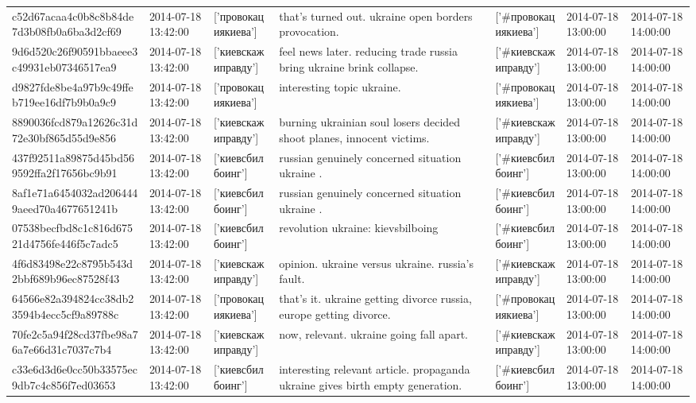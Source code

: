 \begin{tabular}{lllllll}
c52d67acaa4c0b8c8b84de7d3b08fb0a6ba3d2cf69 & 2014-07-18 13:42:00 & ['провокациякиева'] & that's turned out. ukraine open borders provocation. & ['#провокациякиева'] & 2014-07-18 13:00:00 & 2014-07-18 14:00:00 \\
9d6d520c26f90591bbaeee3c49931eb07346517ea9 & 2014-07-18 13:42:00 & ['киевскажиправду'] & feel news later. reducing trade russia bring ukraine brink collapse. & ['#киевскажиправду'] & 2014-07-18 13:00:00 & 2014-07-18 14:00:00 \\
d9827fde8be4a97b9c49ffeb719ee16df7b9b0a9c9 & 2014-07-18 13:42:00 & ['провокациякиева'] & interesting topic ukraine. & ['#провокациякиева'] & 2014-07-18 13:00:00 & 2014-07-18 14:00:00 \\
8890036fcd879a12626c31d72e30bf865d55d9e856 & 2014-07-18 13:42:00 & ['киевскажиправду'] & burning ukrainian soul losers decided shoot planes, innocent victims. & ['#киевскажиправду'] & 2014-07-18 13:00:00 & 2014-07-18 14:00:00 \\
437f92511a89875d45bd569592ffa2f17656bc9b91 & 2014-07-18 13:42:00 & ['киевсбилбоинг'] & russian genuinely concerned situation ukraine . & ['#киевсбилбоинг'] & 2014-07-18 13:00:00 & 2014-07-18 14:00:00 \\
8af1e71a6454032ad2064449aeed70a4677651241b & 2014-07-18 13:42:00 & ['киевсбилбоинг'] & russian genuinely concerned situation ukraine . & ['#киевсбилбоинг'] & 2014-07-18 13:00:00 & 2014-07-18 14:00:00 \\
07538becfbd8c1c816d67521d4756fe446f5c7adc5 & 2014-07-18 13:42:00 & ['киевсбилбоинг'] & revolution ukraine: kievsbilboing & ['#киевсбилбоинг'] & 2014-07-18 13:00:00 & 2014-07-18 14:00:00 \\
4f6d83498e22c8795b543d2bbf689b96ec87528f43 & 2014-07-18 13:42:00 & ['киевскажиправду'] & opinion. ukraine versus ukraine. russia's fault. & ['#киевскажиправду'] & 2014-07-18 13:00:00 & 2014-07-18 14:00:00 \\
64566e82a394824cc38db23594b4ecc5cf9a89788c & 2014-07-18 13:42:00 & ['провокациякиева'] & that's it. ukraine getting divorce russia, europe getting divorce. & ['#провокациякиева'] & 2014-07-18 13:00:00 & 2014-07-18 14:00:00 \\
70fe2c5a94f28cd37fbe98a76a7e66d31c7037c7b4 & 2014-07-18 13:42:00 & ['киевскажиправду'] & now, relevant. ukraine going fall apart. & ['#киевскажиправду'] & 2014-07-18 13:00:00 & 2014-07-18 14:00:00 \\
c33e6d3d6e0cc50b33575ec9db7c4c856f7ed03653 & 2014-07-18 13:42:00 & ['киевсбилбоинг'] & interesting relevant article. propaganda ukraine gives birth empty generation. & ['#киевсбилбоинг'] & 2014-07-18 13:00:00 & 2014-07-18 14:00:00 \\

\end{tabular}
